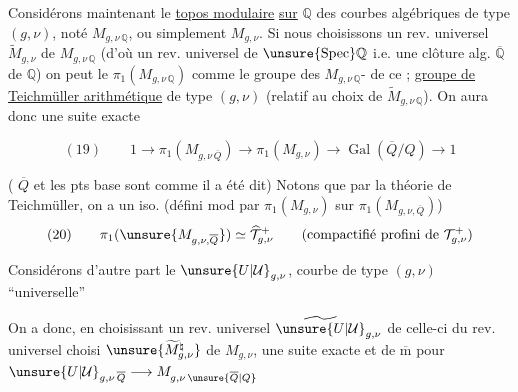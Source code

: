 Considérons maintenant le \uline{topos modulaire} \uline{sur} $\mathbb{Q}$ des courbes algébriques de type $(g,\nu)$, noté $M_{g,\nu\,\mathbb{Q}}$, ou simplement $M_{g,\nu}$. Si nous choisissons un rev. universel $\widetilde{M}_{g,\nu}$ de $M_{g,\nu\,\mathbb{Q}}$ (d'où un rev. universel de $\unsure{\operatorname{Spec}}\mathbb{Q}$ i.e. une clôture alg. $\overline{\mathbb{Q}}$ de $\mathbb{Q}$) on peut  le $\pi_1(M_{g,\nu\,\mathbb{Q}})$ comme le groupe des $M_{g,\nu\,\mathbb{Q}}$- de ce ;   \uline{groupe de Teichmüller arithmétique} de type $(g,\nu)$ (relatif au choix de $\widetilde{M}_{g,\nu\,\mathbb{Q}}$). On aura donc une suite exacte



\[
(19)\qquad 1\longrightarrow \pi_1(M_{g,\nu\,\overline{Q}})
\longrightarrow \pi_1(M_{g,\nu})
\longrightarrow \operatorname{Gal}(\overline{Q}/Q)\longrightarrow 1
\]

( $\overline{Q}$ et les pts base sont  comme il a été dit) Notons que par la théorie  de Teichmüller, on a un iso. (défini mod   par $\pi_1(M_{g,\nu})$ sur $\pi_1(M_{g,\nu,\overline{Q}})$)
\[
(20)\qquad \pi_1(\unsure{M_{g,\nu,\overline{Q}}})\simeq\widehat{\mathcal{T}}_{g,\nu}^{+}
\qquad (\text{compactifié profini de }\mathcal{T}_{g,\nu}^{+})
\]

Considérons d'autre part le  $\unsure{U|\mathcal{U}}_{g,\nu}$, courbe de type $(g,\nu)$ ``universelle''

On a donc, en choisissant un rev. universel $\widetilde{\unsure{U|\mathcal{U}}}_{g,\nu}$ de celle-ci \uline{} du rev. universel choisi $\unsure{\widetilde{M}_{g,\nu}^{\natural}}$ de $M_{g,\nu}$, une suite exacte
et de $\overline{\mathrm m}$ pour $\unsure{U|\mathcal{U}}_{g,\nu\,\overline{Q}}\longrightarrow M_{g,\nu\,\unsure{\overline{Q}|Q}}$

